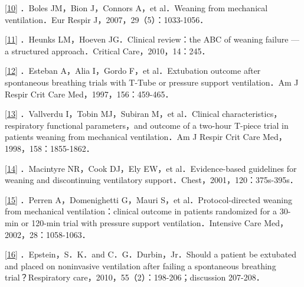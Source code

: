 \protect\hyperlink{text00016.htmlux5cux23ch10-15-back}{{[}10{]}} ．Boles
JM，Bion J，Connors A，et al．Weaning from mechanical ventilation．Eur
Respir J，2007，29（5）：1033-1056．

\protect\hyperlink{text00016.htmlux5cux23ch11-15-back}{{[}11{]}}
．Heunks LM，Hoeven JG．Clinical review：the ABC of weaning failure ---
a structured approach．Critical Care，2010，14：245．

\protect\hyperlink{text00016.htmlux5cux23ch12-15-back}{{[}12{]}}
．Esteban A，Alia I，Gordo F，et al．Extubation outcome after
spontaneous breathing trials with T-Tube or pressure support
ventilation．Am J Respir Crit Care Med，1997，156：459-465．

\protect\hyperlink{text00016.htmlux5cux23ch13-15-back}{{[}13{]}}
．Vallverdu I，Tobin MJ，Subiran M，et al．Clinical
characteristics，respiratory functional parameters，and outcome of a
two-hour T-piece trial in patients weaning from mechanical
ventilation．Am J Respir Crit Care Med，1998，158：1855-1862．

\protect\hyperlink{text00016.htmlux5cux23ch14-15-back}{{[}14{]}}
．Macintyre NR，Cook DJ，Ely EW，et al．Evidence-based guidelines for
weaning and discontinuing ventilatory
support．Chest，2001，120：375s-395s．

\protect\hyperlink{text00016.htmlux5cux23ch15-15-back}{{[}15{]}}
．Perren A，Domenighetti G，Mauri S，et al．Protocol-directed weaning
from mechanical ventilation：clinical outcome in patients randomized for
a 30-min or 120-min trial with pressure support ventilation．Intensive
Care Med，2002，28：1058-1063．

\protect\hyperlink{text00016.htmlux5cux23ch16-15-back}{{[}16{]}}
．Epstein，S．K．and C．G．Durbin，Jr．Should a patient be extubated and
placed on noninvasive ventilation after failing a spontaneous breathing
trial？Respiratory care，2010，55（2）：198-206；discussion 207-208．

\protect\hypertarget{text00017.html}{}{}

